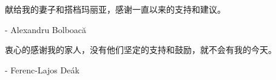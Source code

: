 ﻿献给我的妻子和搭档玛丽亚，感谢一直以来的支持和建议。

\begin{flushright}
- Alexandru Bolboacă
\end{flushright}


衷心的感谢我的家人，没有他们坚定的支持和鼓励，就不会有我的今天。

\begin{flushright}
- Ferenc-Lajos Deák
\end{flushright}
